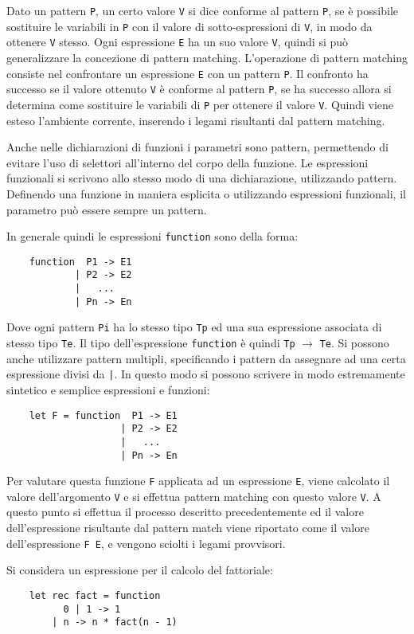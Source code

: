 \documentclass{article}
\numberwithin{equation}{subsection}
\begin{document}
Dato un pattern \verb|P|, un certo valore \verb|V| si dice conforme al pattern \verb|P|, se è possibile sostituire le variabili in \verb|P| con il valore di sotto-espressioni di \verb|V|, in modo da ottenere \verb|V| stesso. 
Ogni espressione \verb|E| ha un suo valore \verb|V|, quindi si può generalizzare la concezione di pattern matching. 
L'operazione di pattern matching consiste nel confrontare un espressione \verb|E| con un pattern \verb|P|. Il confronto ha successo se il valore ottenuto \verb|V| è conforme al pattern \verb|P|, se ha successo allora si determina come sostituire le variabili di \verb|P| per ottenere il valore \verb|V|. Quindi viene esteso l'ambiente corrente, inserendo i legami risultanti dal pattern matching. 


Anche nelle dichiarazioni di funzioni i parametri sono pattern, permettendo di evitare l'uso di selettori all'interno del corpo della funzione. Le espressioni funzionali si scrivono allo stesso modo di una dichiarazione, utilizzando pattern. Definendo una funzione in maniera esplicita o utilizzando espressioni funzionali, il parametro può essere sempre un pattern. 

In generale quindi le espressioni \verb|function| sono della forma:
\begin{verbatim}
    function  P1 -> E1
            | P2 -> E2
            |   ...
            | Pn -> En
\end{verbatim}
Dove ogni pattern \verb|Pi| ha lo stesso tipo \verb|Tp| ed una sua espressione associata di stesso tipo \verb|Te|. Il tipo dell'espressione \verb|function| è quindi \verb|Tp| $\rightarrow$ \verb|Te|. Si possono anche utilizzare pattern multipli, specificando i pattern da assegnare ad una certa espressione divisi da \texttt{|}. In questo modo si possono scrivere in modo estremamente sintetico e semplice espressioni e funzioni:
\begin{verbatim}
    let F = function  P1 -> E1
                    | P2 -> E2
                    |   ...
                    | Pn -> En
\end{verbatim}
Per valutare questa funzione \verb|F| applicata ad un espressione \verb|E|, viene calcolato il valore dell'argomento \verb|V| e si effettua pattern matching con questo valore \verb|V|. A questo punto si effettua il processo descritto precedentemente ed il valore dell'espressione risultante dal pattern match viene riportato come il valore dell'espressione \verb|F E|, e vengono sciolti i legami provvisori. 


Si considera un espressione per il calcolo del fattoriale:
\begin{verbatim}
    let rec fact = function
          0 | 1 -> 1
        | n -> n * fact(n - 1)
\end{verbatim} 
\end{document}

